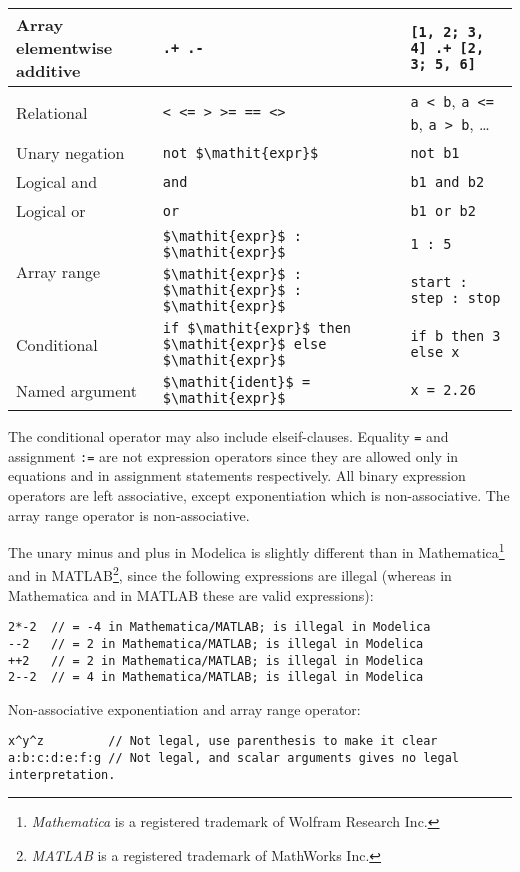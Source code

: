\begin{table}[H]
\begin{center}
\begin{tabular}{l l l}
Array elementwise additive & \lstinline!.+ .-! & \lstinline![1, 2; 3, 4] .+ [2, 3; 5, 6]!\\
\hline
Relational & \lstinline!< <= > >= == <>! & \lstinline!a < b!, \lstinline!a <= b!, \lstinline!a > b!, \ldots\\
\hline
Unary negation & \lstinline!not $\mathit{expr}$! & \lstinline!not b1!\\
\hline
Logical and & \lstinline!and! & \lstinline!b1 and b2!\\
\hline
Logical or & \lstinline!or! & \lstinline!b1 or b2!\\
\hline
\multirow{2}{*}{Array range} & \lstinline!$\mathit{expr}$ : $\mathit{expr}$! & \lstinline!1 : 5!\\
                             & \lstinline!$\mathit{expr}$ : $\mathit{expr}$ : $\mathit{expr}$! & \lstinline!start : step : stop!\\
\hline
Conditional & \lstinline!if $\mathit{expr}$ then $\mathit{expr}$ else $\mathit{expr}$! & \lstinline!if b then 3 else x!\\
\hline
Named argument & \lstinline!$\mathit{ident}$ = $\mathit{expr}$! & \lstinline!x = 2.26!\\
\hline
\end{tabular}
\end{center}
\end{table}

The conditional operator may also include elseif-clauses. Equality \lstinline!=! and
assignment \lstinline!:=! are not expression operators since they are allowed only
in equations and in assignment statements respectively. All binary
expression operators are left associative, except exponentiation which
is non-associative. The array range operator is non-associative.

\begin{nonnormative}
The unary minus and plus in Modelica is slightly different than in Mathematica\footnote{\emph{Mathematica} is a registered trademark of Wolfram Research Inc.} and in MATLAB\footnote{\emph{MATLAB} is
a registered trademark of MathWorks Inc.}, since the following expressions are illegal (whereas in Mathematica and in MATLAB these are valid expressions):
\begin{lstlisting}[language=modelica]
2*-2  // = -4 in Mathematica/MATLAB; is illegal in Modelica
--2   // = 2 in Mathematica/MATLAB; is illegal in Modelica
++2   // = 2 in Mathematica/MATLAB; is illegal in Modelica
2--2  // = 4 in Mathematica/MATLAB; is illegal in Modelica
\end{lstlisting}

Non-associative exponentiation and array range operator:
\begin{lstlisting}[language=modelica]
x^y^z         // Not legal, use parenthesis to make it clear
a:b:c:d:e:f:g // Not legal, and scalar arguments gives no legal interpretation.
\end{lstlisting}
\end{nonnormative}

